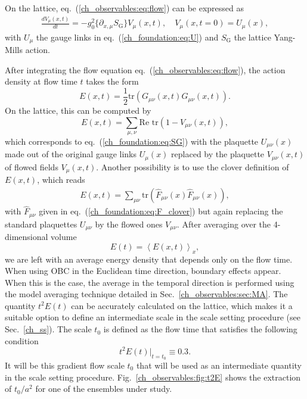 On the lattice, eq.~(\ref{ch_observables:eq:flow}) can be expressed as 
\begin{align}
\frac{dV_{\mu}(x,t)}{dt}=-g_0^2\{\partial_{x,\mu}S_{\textrm{G}}\}V_{\mu}(x,t), \quad V_{\mu}(x,t=0)=U_{\mu}(x),
\end{align}
with $U_{\mu}$ the gauge links in eq.~(\ref{ch_foundation:eq:U}) and $S_{\textrm{G}}$ the lattice Yang-Mills action. 

After integrating the flow equation eq.~(\ref{ch_observables:eq:flow}), the action density at flow time $t$ takes the form
\begin{equation}
E(x,t)=\frac{1}{2}{\textrm{tr}}\left({G}_{\mu\nu}(x,t){G}_{\mu\nu}(x,t)\right).
\end{equation}
On the lattice, this can be computed by
\begin{equation}
E(x,t)=\sum_{\mu,\nu}\textrm{Re tr}\left(1-V_{\mu\nu}(x,t)\right),
\end{equation}
which corresponds to eq.~(\ref{ch_foundation:eq:SG}) with the plaquette $U_{\mu\nu}(x)$ made out of the original gauge links $U_{\mu}(x)$ replaced by the plaquette $V_{\mu\nu}(x,t)$ of flowed fields $V_{\mu}(x,t)$. Another possibility is to use the clover definition of $E(x,t)$, which reads
\begin{align}
\label{ch_observables:eq:E}
E(x,t)=\sum_{\mu\nu}{\textrm{tr}}\left(\hat{F}_{\mu\nu}(x)\hat{F}_{\mu\nu}(x)\right),
\end{align}
with $\hat{F}_{\mu\nu}$ given in eq.~(\ref{ch_foundation:eq:F_clover}) but again replacing the standard plaquettes $U_{\mu\nu}$ by the flowed ones $V_{\mu\nu}$. After averaging over the 4-dimensional volume
\begin{equation}
E(t)=\left<E(x,t)\right>_x,
\end{equation}
we are left with an average energy density that depends only on the flow time. When using OBC in the Euclidean time direction, boundary effects appear. When this is the case, the average in the temporal direction is performed using the model averaging technique detailed in Sec.~\ref{ch_observables:sec:MA}. The quantity $t^2E(t)$ can be accurately calculated on the lattice, which makes it a suitable option to define an intermediate scale in the scale setting procedure (see Sec.~\ref{ch_ss}). The scale $t_0$ is defined as the flow time that satisfies the following condition
\begin{equation}
\label{ch_observables:eq:t0}
t^2E(t)|_{t=t_0}\equiv0.3.
\end{equation}
It will be this gradient flow scale $t_0$ that will be used as an intermediate quantity in the scale setting procedure. Fig.~\ref{ch_observables:fig:t2E} shows the extraction of $t_0/a^2$ for one of the ensembles under study.

